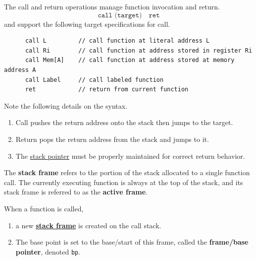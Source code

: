   \begin{definition}
    \label{def:call-return}
    The call and return operations manage function invocation and return.
    \begin{equation}
      \texttt{call (target)} \quad \texttt{ret}
    \end{equation}
    and support the following target specifications for call.
    \begin{lstlisting}
      call L         // call function at literal address L
      call Ri        // call function at address stored in register Ri
      call Mem[A]    // call function at address stored at memory address A
      call Label     // call labeled function
      ret            // return from current function
    \end{lstlisting}
    Note the following details on the syntax.
    \begin{enumerate}
      \item Call pushes the return address onto the stack then jumps to the target.
      \item Return pops the return address from the stack and jumps to it.
      \item The \hyperref[def:stack-pointer]{stack pointer} must be properly maintained for correct return behavior.
    \end{enumerate}
  \end{definition}

  \begin{definition}
    \label{def:stack-frame}
    The \textbf{stack frame} refers to the portion of the stack allocated to a single function call. The currently executing function is always at the top of the stack, and its stack frame is referred to as the \textbf{active frame}. 
  \end{definition}

  \begin{definition}
    \label{def:base-frame-pointer}
    When a function is called, 
    \begin{enumerate}
      \item a new \textbf{\hyperref[def:stack-frame]{stack frame}} is created on the call stack. 
      \item The base point is set to the base/start of this frame, called the \textbf{frame/base pointer}, denoted \texttt{bp}. 
    \end{enumerate}
  \end{definition}

